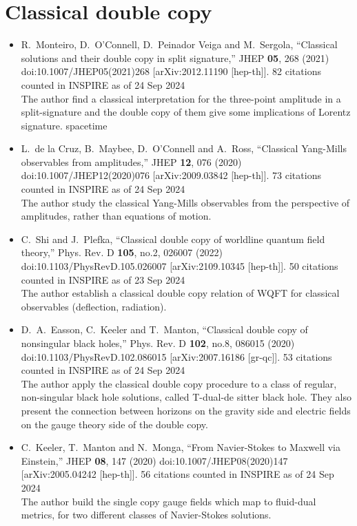 \documentclass[a4paper,12pt]{article}
\begin{document}
\section*{Classical double copy}
\begin{itemize}
    \item %
    R.~Monteiro, D.~O'Connell, D.~Peinador Veiga and M.~Sergola,
    ``Classical solutions and their double copy in split signature,''
    JHEP \textbf{05}, 268 (2021)
    doi:10.1007/JHEP05(2021)268
    [arXiv:2012.11190 [hep-th]].
    82 citations counted in INSPIRE as of 24 Sep 2024\\
    The author find a classical interpretation for the three-point amplitude in a split-signature and the double copy
    of them give some implications of Lorentz signature.
    spacetime
    \item %
    L.~de la Cruz, B.~Maybee, D.~O'Connell and A.~Ross,
    ``Classical Yang-Mills observables from amplitudes,''
    JHEP \textbf{12}, 076 (2020)
    doi:10.1007/JHEP12(2020)076
    [arXiv:2009.03842 [hep-th]].
    73 citations counted in INSPIRE as of 24 Sep 2024\\
    The author study the classical Yang-Mills observables from the perspective of amplitudes, rather than equations of motion.
    \item %
    C.~Shi and J.~Plefka,
    ``Classical double copy of worldline quantum field theory,''
    Phys. Rev. D \textbf{105}, no.2, 026007 (2022)
    doi:10.1103/PhysRevD.105.026007
    [arXiv:2109.10345 [hep-th]].
    50 citations counted in INSPIRE as of 23 Sep 2024\\
    The author establish a classical double
    copy relation of WQFT for classical observables (deflection, radiation).
    \item %
    D.~A.~Easson, C.~Keeler and T.~Manton,
    ``Classical double copy of nonsingular black holes,''
    Phys. Rev. D \textbf{102}, no.8, 086015 (2020)
    doi:10.1103/PhysRevD.102.086015
    [arXiv:2007.16186 [gr-qc]].
    53 citations counted in INSPIRE as of 24 Sep 2024\\
    The author apply the classical double copy procedure to a class of regular, non-singular black hole solutions, 
    called T-dual-de sitter black hole. They also present the connection
    between horizons on the gravity side and electric fields on the gauge theory side of the double copy.
    \item %
    C.~Keeler, T.~Manton and N.~Monga,
    ``From Navier-Stokes to Maxwell via Einstein,''
    JHEP \textbf{08}, 147 (2020)
    doi:10.1007/JHEP08(2020)147
    [arXiv:2005.04242 [hep-th]].
    56 citations counted in INSPIRE as of 24 Sep 2024\\
    The author build the single copy gauge fields which map to fluid-dual metrics, for two different classes of Navier-Stokes solutions.
     

\end{itemize}
\end{document}
